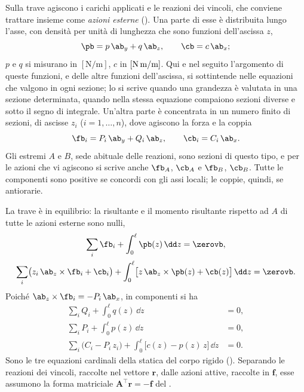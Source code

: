 Sulla trave agiscono i carichi applicati e le reazioni
dei vincoli, che conviene trattare insieme come
\emph{azioni esterne} ().
Una parte di esse è distribuita lungo l'asse, con
densità per unità di lunghezza che sono funzioni
dell'ascissa $z$,
\begin{equation}\label{eq:densita}
	\pb = p\,\ab_y + q\,\ab_z, \qquad
	\cb = c\,\ab_x;
\end{equation}
$p$ e $q$ si misurano in $[\text{N/m}]$, $c$ in
$[\text{N\,m/m}]$. Qui e nel seguito l'argomento di
queste funzioni, e delle altre funzioni dell'ascissa,
si sottintende nelle equazioni che valgono in ogni
sezione; lo si scrive quando una grandezza è valutata in
una sezione determinata, quando nella stessa equazione
compaiono sezioni diverse e sotto il segno di integrale.
Un'altra parte è concentrata in un numero finito di
sezioni, di ascisse $z_i$ ($i = 1, \ldots, n$), dove
agiscono la forza e la coppia
\begin{equation}\label{eq:concentrate}
	\fb_i = P_i\,\ab_y + Q_i\,\ab_z, \qquad
	\cb_i = C_i\,\ab_x.
\end{equation}
Gli estremi $A$ e $B$, sede abituale delle reazioni, sono
sezioni di questo tipo, e per le azioni che vi agiscono si
scrive anche $\fb_A$, $\cb_A$ e $\fb_B$, $\cb_B$. Tutte
le componenti sono positive se concordi con gli assi
locali; le coppie, quindi, se antiorarie.



La trave è in equilibrio: la
risultante e il momento risultante rispetto ad $A$ di
tutte le azioni esterne sono nulli,
\begin{gather*}
	\sum_{i} \fb_i + \int_0^\ell \pb(z)\,\dd z = \zerovb,
	\\
	\sum_{i} \bigl(z_i\,\ab_z \times \fb_i + \cb_i\bigr)
	+ \int_0^\ell \bigl[z\,\ab_z \times \pb(z) + \cb(z)\bigr]\,\dd z = \zerovb.
\end{gather*}
Poiché $\ab_z \times \fb_i = -P_i\,\ab_x$, in componenti
si ha
\begin{align}
	\sum_{i} Q_i + \int_0^\ell q(z)\,\dd z &= 0,
	\label{eq:eq_glob_z}\\
	\sum_{i} P_i + \int_0^\ell p(z)\,\dd z &= 0,
	\label{eq:eq_glob_y}\\
	\sum_{i} \bigl(C_i - P_i\,z_i\bigr)
	+ \int_0^\ell \bigl[c(z) - p(z)\,z\bigr]\,\dd z &= 0.
	\label{eq:eq_glob_mu}
\end{align}
Sono le tre equazioni cardinali della statica del corpo
rigido (). Separando le reazioni
dei vincoli, raccolte nel vettore $\bm{r}$, dalle azioni
attive, raccolte in $\bm{f}$, esse assumono la forma
matriciale $\bm{A}^{\top}\bm{r} = -\bm{f}$ del
.




